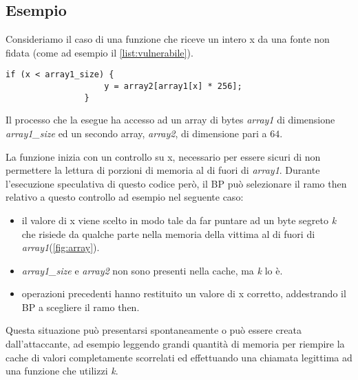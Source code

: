 		\subsection{Esempio}
		
			Consideriamo il caso di una funzione che riceve un intero x da una fonte non fidata (come ad esempio il \cref{list:vulnerabile}).
			
			\begin{lstlisting}[caption={funzione sotto attacco},label={list:vulnerabile}]
				if (x < array1_size) {
					y = array2[array1[x] * 256];
				}
			\end{lstlisting}
			
			Il processo che la esegue ha accesso ad un array di bytes \emph{array1} di dimensione \emph{array1\_size} ed un secondo array, \emph{array2}, di dimensione pari a $64$\kilobyte.
			
			La funzione inizia con un controllo su x, necessario per essere sicuri di non permettere la lettura di porzioni di memoria al di fuori di \emph{array1}. Durante l'esecuzione speculativa di questo codice però, il \ac{BP} può selezionare il ramo then relativo a questo controllo ad esempio nel seguente caso:
			
			\begin{itemize}
				\item il valore di x viene scelto in modo tale da far puntare  ad un byte segreto \emph{k} che risiede da qualche parte nella memoria della vittima al di fuori di \emph{array1}(\cref{fig:array}).
				\item \emph{array1\_size} e \emph{array2} non sono presenti nella cache, ma \emph{k} lo è.
				\item operazioni precedenti hanno restituito un valore di x corretto, addestrando il \ac{BP} a scegliere il ramo then.
			\end{itemize}
		
			Questa situazione può presentarsi spontaneamente o può essere creata dall'attaccante, ad esempio leggendo grandi quantità di memoria per riempire la cache di valori completamente scorrelati ed effettuando una chiamata legittima ad una funzione che utilizzi \emph{k}.
			
